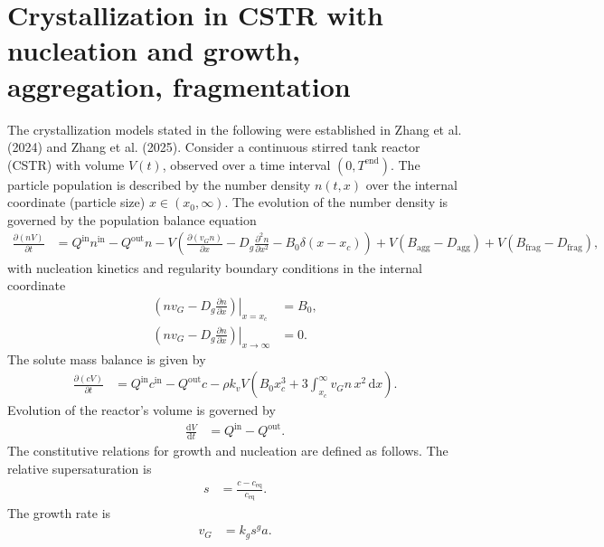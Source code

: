 \documentclass{article}
\begin{document}
\section*{Crystallization in CSTR with nucleation and growth, aggregation, fragmentation}
The crystallization models stated in the following were established in Zhang et al. (2024) and Zhang et al. (2025).
Consider a continuous stirred tank reactor (CSTR) with volume $V(t)$, observed over a time interval $(0, T^{\mathrm{end}})$.
The particle population is described by the number density $n(t, x)$ over the internal coordinate (particle size) $x\in(x_{0}, \infty)$.
The evolution of the number density is governed by the population balance equation
\begin{align}
    \frac{\partial (n V)}{\partial t}
    &= Q^{\mathrm{in}} n^{\mathrm{in}}
        - Q^{\mathrm{out}} n
        - V \left( \frac{\partial (v_{G} n)}{\partial x} - D_{g} \frac{\partial^{2} n}{\partial x^{2}} - B_{0} \delta(x - x_{c}) \right)
        + V \left( B_{\mathrm{agg}} - D_{\mathrm{agg}} \right)
        + V \left( B_{\mathrm{frag}} - D_{\mathrm{frag}} \right),
\end{align}
with nucleation kinetics and regularity boundary conditions in the internal coordinate
\begin{align}
    \left. \left( n v_{G} - D_{g} \frac{\partial n}{\partial x} \right) \right|_{x = x_{c}}
    &= B_{0},
    \\
    \left. \left( n v_{G} - D_{g} \frac{\partial n}{\partial x} \right) \right|_{x \to \infty}
    &= 0.
\end{align}
The solute mass balance is given by
\begin{align}
    \frac{\partial (c V)}{\partial t}
    &= Q^{\mathrm{in}} c^{\mathrm{in}}
        - Q^{\mathrm{out}} c
        - \rho k_{v} V \left( B_{0} x_{c}^{3} + 3 \int_{x_{c}}^{\infty} v_{G} n \, x^{2} \, \mathrm{d}x \right).
\end{align}
Evolution of the reactor’s volume is governed by
\begin{align}
    \frac{\mathrm{d} V}{\mathrm{d} t}
    &= Q^{\mathrm{in}}
        - Q^{\mathrm{out}}.
\end{align}
The constitutive relations for growth and nucleation are defined as follows.
The relative supersaturation is
\begin{align}
    s
    &= \frac{c - c_{\mathrm{eq}}}{c_{\mathrm{eq}}}.
\end{align}
The growth rate is
\begin{align}
    v_{G}
    &= k_{g} s^{g} a.
\end{align}
\end{document}
